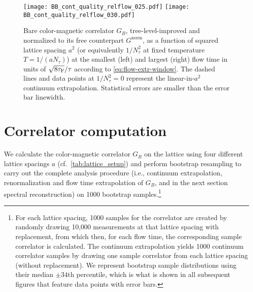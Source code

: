 \documentclass[floatfix,twocolumn,prd,showpacs,preprintnumbers,amsmath,nofootinbib,amssymb,superscriptaddress]{revtex4-2}
\begin{document}
\begin{figure*}
    \null \hfill
    \texttt{[image: BB\_cont\_quality\_relflow\_025.pdf]}
    \hspace{2.1cm}
    \texttt{[image: BB\_cont\_quality\_relflow\_030.pdf]}
    \hfill \null
    \caption{Bare color-magnetic correlator $G_B$, tree-level-improved and normalized to its free counterpart $G^\text{norm}$, as a function of squared lattice spacing $a^2$ (or equivalently $1/N_\tau^2$ at fixed temperature $T=1/(a N_\tau)$) at the smallest (left) and largest (right) flow time in units of $\sqrt{8\tau_\mathrm{F}}/\tau$ according to \cref{eq:flow-extr-window}. The dashed lines and data points at $1/N_\tau^2=0$ represent the linear-in-$a^2$ continuum extrapolation. Statistical errors are smaller than the error bar linewidth.}
\label{fig:corr-cont-extrapo}
\end{figure*}

\section{Correlator computation}
\label{sec:extrap}

We calculate the color-magnetic correlator $G_B$ on the lattice using four different lattice spacings $a$ (cf.\ \cref{tab:lattice_setup}) and perform bootstrap resampling to carry out the complete analysis procedure (i.e., continuum extrapolation, renormalization and flow time extrapolation of $G_B$, and in the next section spectral reconstruction) on 1000 bootstrap samples.\footnote{For each lattice spacing, 1000 samples for the correlator are created by randomly drawing 10,000 measurements at that lattice spacing with replacement, from which then, for each flow time, the corresponding sample correlator is calculated. The continuum extrapolation yields 1000 continuum correlator samples by drawing one sample correlator from each lattice spacing (without replacement). We represent bootstrap sample distributions using their median $\pm 34\mathrm{th}$ percentile, which is what is shown in all subsequent figures that feature data points with error bars.}
\end{document}
